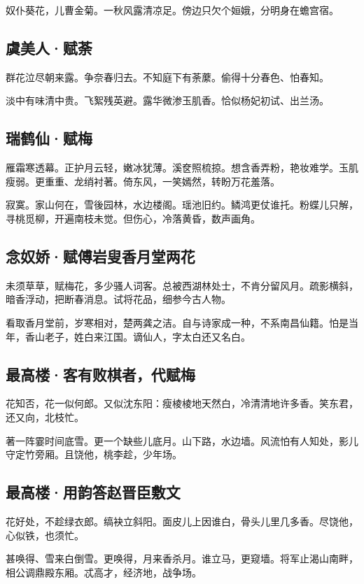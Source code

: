 \documentclass[a5paper]{ctexart}
\begin{document}
	奴仆葵花，儿曹金菊。一秋风露清凉足。傍边只欠个姮娥，分明身在蟾宫宿。
	
	\subsection{虞美人·赋荼}
	群花泣尽朝来露。争奈春归去。不知庭下有荼䕷。偷得十分春色、怕春知。
	
	淡中有味清中贵。飞絮残英避。露华微渗玉肌香。恰似杨妃初试、出兰汤。
	
	\subsection{瑞鹤仙·赋梅}
	雁霜寒透幕。正护月云轻，嫩冰犹薄。溪奁照梳掠。想含香弄粉，艳妆难学。玉肌瘦弱。更重重、龙绡衬著。倚东风，一笑嫣然，转盼万花羞落。
	
	寂寞。家山何在，雪後园林，水边楼阁。瑶池旧约。鳞鸿更仗谁托。粉蝶儿只解，寻桃觅柳，开遍南枝未觉。但伤心，冷落黄昏，数声画角。
	
	\subsection{念奴娇·赋傅岩叟香月堂两花}
	未须草草，赋梅花，多少骚人词客。总被西湖林处士，不肯分留风月。疏影横斜，暗香浮动，把断春消息。试将花品，细参今古人物。
	
	看取香月堂前，岁寒相对，楚两龚之洁。自与诗家成一种，不系南昌仙籍。怕是当年，香山老子，姓白来江国。谪仙人，字太白还又名白。
	
	\subsection{最高楼·客有败棋者，代赋梅}
	花知否，花一似何郎。又似沈东阳：瘦棱棱地天然白，冷清清地许多香。笑东君，还又向，北枝忙。
	
	著一阵霎时间底雪。更一个缺些儿底月。山下路，水边墙。风流怕有人知处，影儿守定竹旁厢。且饶他，桃李趁，少年场。
	
	\subsection{最高楼·用韵答赵晋臣敷文}
	花好处，不趁绿衣郎。缟袂立斜阳。面皮儿上因谁白，骨头儿里几多香。尽饶他，心似铁，也须忙。
	
	甚唤得、雪来白倒雪。更唤得，月来香杀月。谁立马，更窥墙。将军止渴山南畔，相公调鼎殿东厢。忒高才，经济地，战争场。
	
	
	
\end{document}

